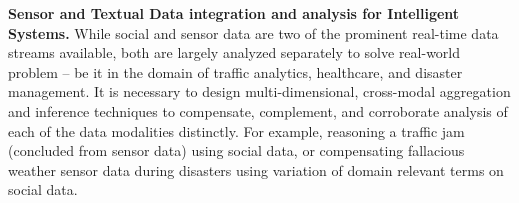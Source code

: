 \documentclass[12pt]{letter} %
\begin{document}
\textbf{Sensor and Textual Data integration and analysis for Intelligent Systems.}
While social and sensor data are two of the prominent real-time data streams available, both are largely analyzed separately to solve real-world problem -- be  it in the domain of traffic analytics, healthcare, and disaster management. It is necessary to design multi-dimensional, cross-modal aggregation and inference techniques to compensate, complement, and corroborate analysis of each of the data modalities distinctly. For example, reasoning a traffic jam (concluded from sensor data) using social data, or compensating fallacious weather sensor data during disasters using variation of domain relevant terms on social data. 
 
\end{document}
